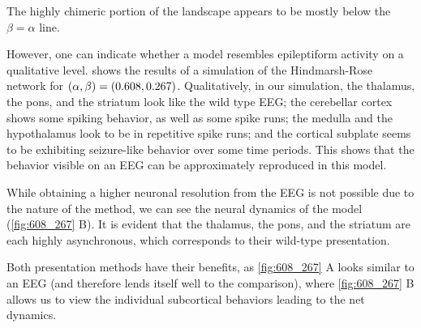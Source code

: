 The highly chimeric portion of the landscape appears to be mostly below the $\beta = \alpha$ line.

However, one can indicate whether a model resembles epileptiform activity on a qualitative level.
 shows the results of a simulation of the Hindmarsh-Rose network for $\pqty{\hra, \hrb} = \pqty{0.608, 0.267}$.
Qualitatively, in our simulation,
the thalamus, the pons, and the striatum look like the wild type EEG;
the cerebellar cortex shows some spiking behavior,
as well as some spike runs;
the medulla and the hypothalamus look to be in repetitive spike runs;
and the cortical subplate seems to be exhibiting seizure-like behavior over some time periods.
This shows that the behavior visible on an EEG can be approximately reproduced in this model.

While obtaining a higher neuronal resolution from the EEG is not possible due to the nature of the method,
we can see the neural dynamics of the model (\cref{fig:608_267} B).
It is evident that the thalamus, the pons, and the striatum are each highly asynchronous, which corresponds to their wild-type presentation.

Both presentation methods have their benefits, as \cref{fig:608_267} A looks similar to an EEG (and therefore lends itself well to the comparison), where \cref{fig:608_267} B allows us to view the individual subcortical behaviors leading to the net dynamics.
